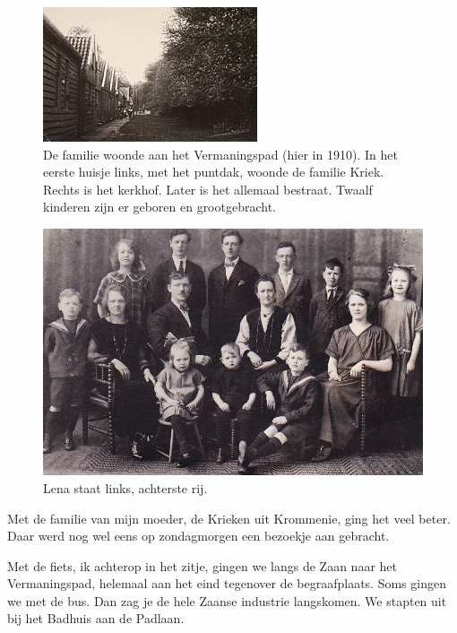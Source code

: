 \documentclass[12pt,twoside]{memoir}
\begin{document}
\begin{figure}
\includegraphics[width=\textwidth]{img/ch3/Vermaningspad1910}
\caption*{\footnotesize De familie woonde aan het Vermaningspad (hier in 1910). In het eerste huisje links, met het puntdak, woonde de familie Kriek. Rechts is het kerkhof. Later is het allemaal bestraat. Twaalf kinderen zijn er geboren en grootgebracht.}
\end{figure}

\begin{figure}
\includegraphics[width=\textwidth]{img/ch3/familie}
\caption*{\footnotesize Lena staat links, achterste rij.}
\end{figure}

Met de familie van mijn moeder, de Krieken uit Krommenie, ging het veel beter. Daar werd nog wel eens op zondagmorgen een bezoekje aan gebracht.   

Met de fiets, ik achterop in het zitje, gingen we langs de Zaan naar het Vermaningspad, helemaal aan het eind tegenover de begraafplaats. Soms gingen we met de bus. Dan zag je de hele Zaanse industrie langskomen. We stapten uit bij het Badhuis aan de Padlaan. 
\end{document}
